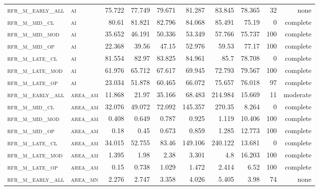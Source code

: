 \begin{landscape}
\begin{center}
\begin{footnotesize}
\begin{longtable}{llrrrrr|rrr}
\textsc{rfr\_m\_early\_all} & \textsc{ai        }   & 75.722  & 77.749  & 79.671  & 81.287   & 83.845   & 78.365  & 32  & none     \\
\textsc{rfr\_m\_mid\_cl   } & \textsc{ai        }   & 80.61   & 81.821  & 82.796  & 84.068   & 85.491   & 75.19   & 0   & complete \\
\textsc{rfr\_m\_mid\_mod  } & \textsc{ai        }   & 35.652  & 46.191  & 50.336  & 53.349   & 57.766   & 75.737  & 100 & complete \\
\textsc{rfr\_m\_mid\_op   } & \textsc{ai        }   & 22.368  & 39.56   & 47.15   & 52.976   & 59.53    & 77.17   & 100 & complete \\
\textsc{rfr\_m\_late\_cl  } & \textsc{ai        }   & 81.554  & 82.97   & 83.825  & 84.961   & 85.7     & 78.708  & 0   & complete \\
\textsc{rfr\_m\_late\_mod } & \textsc{ai        }   & 61.976  & 65.712  & 67.617  & 69.945   & 72.793   & 79.567  & 100 & complete \\
\textsc{rfr\_m\_late\_op  } & \textsc{ai        }   & 23.034  & 51.878  & 60.465  & 66.072   & 75.657   & 76.018  & 97  & complete \\
\textsc{rfr\_m\_early\_all} & \textsc{area\_am  }   & 11.868  & 21.97   & 35.166  & 68.483   & 214.984  & 15.669  & 11  & moderate \\
\textsc{rfr\_m\_mid\_cl   } & \textsc{area\_am  }   & 32.076  & 49.072  & 72.092  & 145.357  & 270.35   & 8.264   & 0   & complete \\
\textsc{rfr\_m\_mid\_mod  } & \textsc{area\_am  }   & 0.408   & 0.649   & 0.787   & 0.925    & 1.119    & 10.406  & 100 & complete \\
\textsc{rfr\_m\_mid\_op   } & \textsc{area\_am  }   & 0.18    & 0.45    & 0.673   & 0.859    & 1.285    & 12.773  & 100 & complete \\
\textsc{rfr\_m\_late\_cl  } & \textsc{area\_am  }   & 34.015  & 52.755  & 83.46   & 149.106  & 240.122  & 13.681  & 0   & complete \\
\textsc{rfr\_m\_late\_mod } & \textsc{area\_am  }   & 1.395   & 1.98    & 2.38    & 3.301    & 4.8      & 16.203  & 100 & complete \\
\textsc{rfr\_m\_late\_op  } & \textsc{area\_am  }   & 0.15    & 0.738   & 1.029   & 1.472    & 2.414    & 6.52    & 100 & complete \\
\textsc{rfr\_m\_early\_all} & \textsc{area\_mn  }   & 2.276   & 2.747   & 3.358   & 4.026    & 5.405    & 3.98    & 74  & none     \\

\end{longtable}
\end{footnotesize}
\end{center}
\end{landscape}
